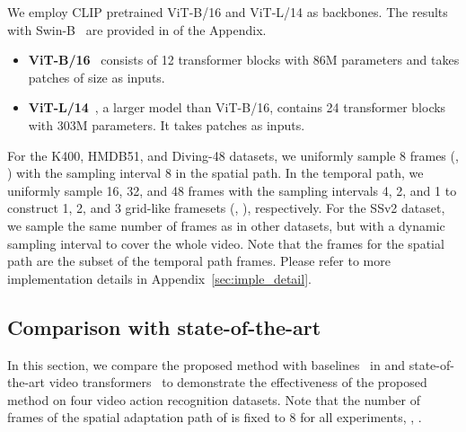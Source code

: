     We employ CLIP pretrained ViT-B/16 and ViT-L/14 as backbones. The results with Swin-B~\cite{swin} are provided in  of the Appendix.\vspace{-5pt}
    \begin{itemize}
        \item{\textbf{ViT-B/16}}~\cite{vit} consists of 12 transformer blocks with 86M parameters and takes patches of size  as inputs.
        \vspace{-5pt}
        \item{\textbf{ViT-L/14}}~\cite{vit}, a larger model than ViT-B/16, contains 24 transformer blocks with 303M parameters. It takes  patches as inputs.
        \vspace{-5pt}
    \end{itemize}

    For the K400, HMDB51, and Diving-48 datasets, we uniformly sample 8 frames (\ie, ) with the sampling interval 8 in the spatial path.
    In the temporal path, we uniformly sample 16, 32, and 48 frames with the sampling intervals 4, 2, and 1 to construct 1, 2, and 3 grid-like framesets (\ie, ), respectively.
    For the SSv2 dataset, we sample the same number of frames as in other datasets, but with a dynamic sampling interval to cover the whole video.
    Note that the frames for the spatial path are the subset of the temporal path frames.
    Please refer to more implementation details in Appendix~\ref{sec:imple_detail}.
    

\subsection{Comparison with state-of-the-art} \vspace{-5pt}
    In this section, we compare the proposed method with baselines~\cite{adaptformer, vpt, protuning, st-adapter} in  and state-of-the-art video transformers~\cite{multiscale, uniformer, space-time, vivit, video-swin, multiscale-v2, multiview, tokenlearner, actionclip, x-clip, frozen-clip} to demonstrate the effectiveness of the proposed method on four video action recognition datasets.
    Note that the number of frames of the spatial adaptation path of \method is fixed to 8 for all experiments, \ie, .
    
